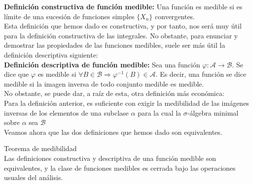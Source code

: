 \documentclass[12pt,a4paper]{book}
\begin{document}
\textbf{Definición constructiva de función medible:} Una función es medible si es límite de una sucesión de funciones simples $\{X_n\}$ convergentes.\\

Esta definición que hemos dado es constructiva, y por tanto, nos será muy útil para la definición constructiva de las integrales. No obstante, para enunciar y demostrar las propiedades de las funciones medibles, suele ser más útil la definición descriptiva siguiente:\\

\textbf{Definición descriptiva de función medible:} Sea una función $\varphi : \mathcal{A} \rightarrow \mathcal{B}$. Se dice que $\varphi$ es medible si $\forall B \in \mathcal{B} \Rightarrow \varphi^{-1}(B) \in \mathcal{A}$. Es decir, una función se dice medible si la imagen inversa de todo conjunto medible es medible.\\

No obstante, se puede dar, a raíz de esta, otra definición más económica:\\

Para la definición anterior, es suficiente con exigir la medibilidad de las imágenes inversas de los elementos de una subclase $\alpha$ para la cual la $\sigma$-álgebra minimal sobre $\alpha$ sea $\mathcal{B}$\\

Veamos ahora que las dos definiciones que hemos dado son equivalentes.

\begin{theorem} Teorema de medibilidad\\
Las definiciones constructiva y descriptiva de una función medible son equivalentes, y la clase de funciones medibles es cerrada bajo las operaciones usuales del análisis.
\end{theorem}
\end{document}
